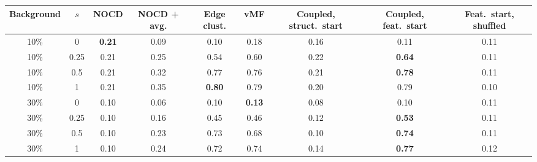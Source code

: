 \begin{tabular}{ccccccccc}
\toprule
Background & $s$ & NOCD & NOCD + avg. & Edge clust. & vMF & Coupled, struct.\ start & Coupled, feat.\ start & Feat.\ start, shuffled \\
\midrule
10\% & 0 & \textbf{0.21} & 0.09 & 0.10 & 0.18 & 0.16 & 0.11 & 0.11 \\
10\% & 0.25 & 0.21 & 0.25 & 0.54 & 0.60 & 0.22 & \textbf{0.64} & 0.11 \\
10\% & 0.5 & 0.21 & 0.32 & 0.77 & 0.76 & 0.21 & \textbf{0.78} & 0.11 \\
10\% & 1 & 0.21 & 0.35 & \textbf{0.80} & 0.79 & 0.20 & 0.79 & 0.10 \\
30\% & 0 & 0.10 & 0.06 & 0.10 & \textbf{0.13} & 0.08 & 0.10 & 0.11 \\
30\% & 0.25 & 0.10 & 0.16 & 0.45 & 0.46 & 0.12 & \textbf{0.53} & 0.11 \\
30\% & 0.5 & 0.10 & 0.23 & 0.73 & 0.68 & 0.10 & \textbf{0.74} & 0.11 \\
30\% & 1 & 0.10 & 0.24 & 0.72 & 0.74 & 0.14 & \textbf{0.77} & 0.12 \\
\bottomrule
\end{tabular}

